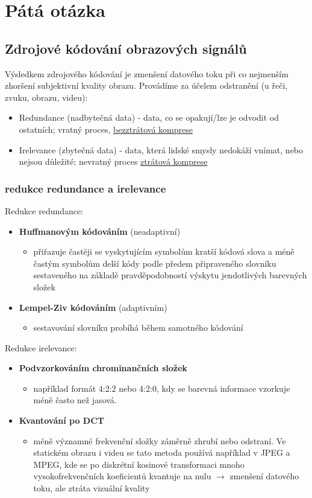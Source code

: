 \chapter{Pátá otázka}
\section{Zdrojové kódování obrazových signálů}
Výsledkem zdrojového kódování je zmenšení datového toku při co nejmenším zhoršení subjektivní kvality obrazu.
Provádíme za účelem odstranění (u řeči, zvuku, obrazu, videu):
\begin{itemize}
	\item Redundance (nadbytečná data) - data, co se opakují/lze je odvodit od ostatních; vratný proces, \underline{bezztrátová komprese}
	\item Irelevance (zbytečná data) - data, která lidské smysly nedokáží vnímat, nebo nejsou důležité; nevratný proces \underline{ztrátová komprese}
\end{itemize}
\subsection{redukce redundance a irelevance}
Redukce redundance: 
\begin{itemize}
	\item \textbf{Huffmanovým kódováním} (neadaptivní)
	\begin{itemize}
		\item přiřazuje častěji se vyskytujícím symbolům kratší kódová slova a méně častým symbolům delší kódy podle předem připraveného slovníku sestaveného na základě pravděpodobností výskytu jendotlivých barevných složek
	\end{itemize}
	\item \textbf{Lempel-Ziv kódováním} (adaptivním)
	\begin{itemize}
		\item sestavování slovníku probíhá během samotného kódování
	\end{itemize}
\end{itemize}

Redukce irelevance: 
\begin{itemize}
	\item \textbf{Podvzorkováním chrominančních složek}
	\begin{itemize}
		\item například formát 4:2:2 nebo 4:2:0, kdy se barevná informace vzorkuje méně často než jasová.
	\end{itemize}
	\item \textbf{Kvantování po DCT}
	\begin{itemize}
		\item méně významné frekvenční složky záměrně zhrubí nebo odstraní. Ve statickém obrazu i videu se tato metoda používá například v JPEG a MPEG, kde se po diskrétní kosinové transformaci mnoho vysokofrekvenčních koeficientů kvantuje na nulu $\rightarrow$ zmenšení datového toku, ale ztráta vizuální kvality
	\end{itemize}
\end{itemize}

